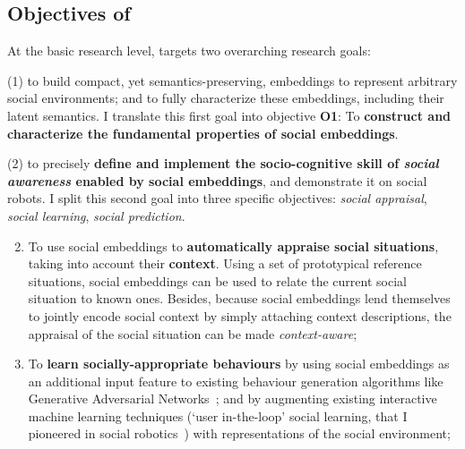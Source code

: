 \subsection{Objectives of \project}


\begin{rewrite}


At the basic research level, \project targets two overarching research goals:

(1) to build compact, yet semantics-preserving, embeddings to represent
arbitrary social environments; and to fully characterize these embeddings,
including their latent semantics. I translate this first goal into objective
{\bf O1}: To \textbf{construct and characterize the fundamental
properties of social embeddings}.

(2) to precisely \textbf{define and implement the socio-cognitive skill of \emph{social awareness} enabled
by social embeddings}, and demonstrate it on social robots. I split this second
goal into three specific objectives: \emph{social appraisal}, \emph{social
learning}, \emph{social prediction}.



\begin{enumerate}[label=\textbf{O\arabic*}]
    \setcounter{enumi}{1}
    \item \label{T5} To use social embeddings to \textbf{automatically appraise
        social situations}, taking into account their \textbf{context}. Using
        a set of prototypical reference situations, social embeddings
        can be used to relate the current social situation to known ones.
        Besides, because social embeddings lend themselves to jointly encode
        social context by simply attaching context descriptions, the appraisal
        of the social situation can be made \emph{context-aware};

    \item \label{T4} To \textbf{learn socially-appropriate behaviours} by using
        social embeddings as an additional input feature to existing behaviour
        generation algorithms like Generative Adversarial
        Networks~\cite{marmpena2019generating,suguitan2020moveae}; and by
        augmenting existing interactive machine learning techniques (`user
        in-the-loop' social learning, that I pioneered in social
        robotics~\cite{senft2017supervised, winkle2020couch,winkle2021leador})
        with representations of the social environment;


\end{enumerate}
\end{rewrite}
